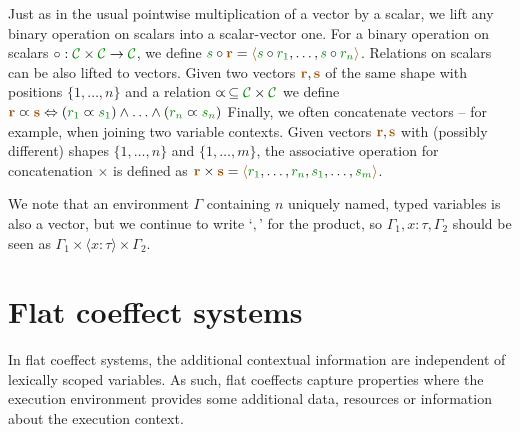 Just as in the usual pointwise multiplication of a vector by a scalar, we lift any binary operation on scalars into a 
scalar-vector one. For a binary operation on scalars $\circ : \C \times \C \rightarrow \C$, we define
 $\cclrd{s} \circ \aclrd{\textbf{r}} = \alift{ \cclrd{s}\circ\cclrd{r_1}, \ldots, \cclrd{s}\circ\cclrd{r_n}}$.
Relations on scalars can be also lifted to vectors. Given two vectors $\aclrd{\textbf{r}}, \aclrd{\textbf{s}}$ of the
same shape with positions $\{ 1, \ldots, n \}$ and a relation $\varpropto\, \subseteq \C \times \C$ we define 
$\aclrd{\textbf{r}} \varpropto \aclrd{\textbf{s}} \Leftrightarrow (\cclrd{r_1} \varpropto \cclrd{s_1}) \wedge \ldots \wedge (\cclrd{r_n} \varpropto \cclrd{s_n}) $
Finally, we often concatenate vectors -- for example, when joining two variable contexts.
Given vectors $\aclrd{\textbf{r}}, \aclrd{\textbf{s}}$ with (possibly different) shapes $\{ 1, \ldots, n \}$ and 
$\{ 1, \ldots, m \}$, the associative operation for concatenation $\times$ is defined as 
$\aclrd{\textbf{r}}\times\aclrd{\textbf{s}} = \alift{\cclrd{r_1},\ldots,\cclrd{r_n},\cclrd{s_1},\ldots,\cclrd{s_m}}$.

We note that an environment $\Gamma$ containing $n$ uniquely named, typed variables is also a vector, 
but we continue to write `$,$' for the product, so $\Gamma_1, x\!:\!\tau, \Gamma_2$ should 
be seen as $\Gamma_1 \times \langle x\!:\!\tau\rangle \times \Gamma_2$.




%	                            
%	                            

\section{Flat coeffect systems}
\label{sec:applications-flat}

In flat coeffect systems, the additional contextual information are independent of lexically scoped
variables. As such, flat coeffects capture properties where the execution environment provides some 
additional data, resources or information about the execution context.

